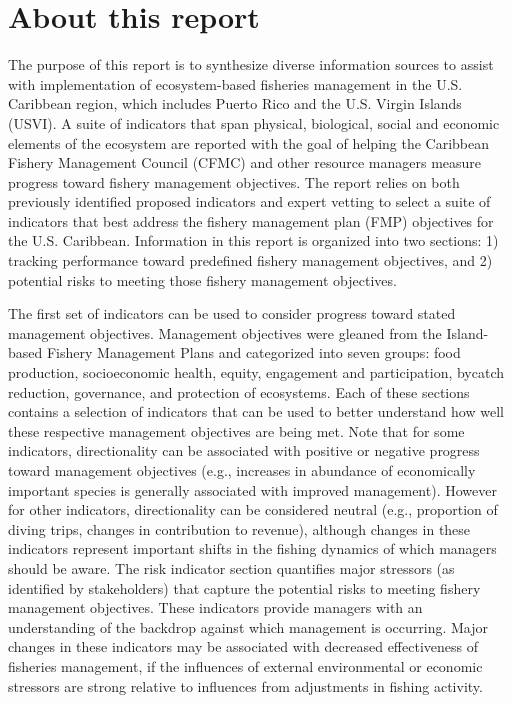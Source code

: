 \documentclass[
  letterpaper,
  oneside,
  open=any]{scrbook}
\begin{document}
\section{About this report}\label{about-this-report}

The purpose of this report is to synthesize diverse information sources
to assist with implementation of ecosystem-based fisheries management in
the U.S. Caribbean region, which includes Puerto Rico and the U.S.
Virgin Islands (USVI). A suite of indicators that span physical,
biological, social and economic elements of the ecosystem are reported
with the goal of helping the Caribbean Fishery Management Council (CFMC)
and other resource managers measure progress toward fishery management
objectives. The report relies on both previously identified proposed
indicators and expert vetting to select a suite of indicators that best
address the fishery management plan (FMP) objectives for the U.S.
Caribbean. Information in this report is organized into two sections: 1)
tracking performance toward predefined fishery management objectives,
and 2) potential risks to meeting those fishery management objectives.

The first set of indicators can be used to consider progress toward
stated management objectives. Management objectives were gleaned from
the Island-based Fishery Management Plans and categorized into seven
groups: food production, socioeconomic health, equity, engagement and
participation, bycatch reduction, governance, and protection of
ecosystems. Each of these sections contains a selection of indicators
that can be used to better understand how well these respective
management objectives are being met. Note that for some indicators,
directionality can be associated with positive or negative progress
toward management objectives (e.g., increases in abundance of
economically important species is generally associated with improved
management). However for other indicators, directionality can be
considered neutral (e.g., proportion of diving trips, changes in
contribution to revenue), although changes in these indicators represent
important shifts in the fishing dynamics of which managers should be
aware. The risk indicator section quantifies major stressors (as
identified by stakeholders) that capture the potential risks to meeting
fishery management objectives. These indicators provide managers with an
understanding of the backdrop against which management is occurring.
Major changes in these indicators may be associated with decreased
effectiveness of fisheries management, if the influences of external
environmental or economic stressors are strong relative to influences
from adjustments in fishing activity.
\end{document}
